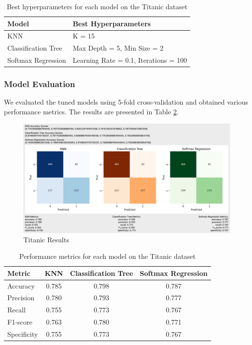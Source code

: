\documentclass[letterpaper,10pt]{article}
\begin{document}
\begin{table}[ht]
\centering
\caption{Best hyperparameters for each model on the Titanic dataset}
\label{tab:titanic_tuning}
\begin{tabular}{|l|l|}
\hline
\textbf{Model} & \textbf{Best Hyperparameters} \\
\hline
KNN & K = 15 \\
\hline
Classification Tree & Max Depth = 5, Min Size = 2 \\
\hline
Softmax Regression & Learning Rate = 0.1, Iterations = 100 \\
\hline
\end{tabular}
\end{table}

\subsubsection{Model Evaluation}

We evaluated the tuned models using 5-fold cross-validation and obtained various performance metrics. The results are presented in Table \ref{tab:titanic_metrics}.

\begin{figure}[ht]
    \centering
    \includegraphics[width=1.0\textwidth]{titanic_results.png}
    \caption{Titanic Results}
    \label{titanic_results}
\end{figure}
\begin{table}[ht]
\centering
\caption{Performance metrics for each model on the Titanic dataset}
\label{tab:titanic_metrics}
\begin{tabular}{|l|c|c|c|}
\hline
\textbf{Metric} & \textbf{KNN} & \textbf{Classification Tree} & \textbf{Softmax Regression} \\
\hline
Accuracy & 0.785 & 0.798 & 0.787 \\
\hline
Precision & 0.780 & 0.793 & 0.777 \\
\hline
Recall & 0.755 & 0.773 & 0.767 \\
\hline
F1-score & 0.763 & 0.780 & 0.771 \\
\hline
Specificity & 0.755 & 0.773 & 0.767 \\
\hline
\end{tabular}
\end{table}
\end{document}

